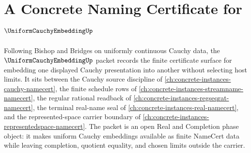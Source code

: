 \chapter{A Concrete Naming Certificate for $\UniformCauchyEmbeddingUp$}
\label{ch:concrete-instances-uniform-cauchy-embedding-namecert}

Following Bishop and Bridges on uniformly continuous Cauchy data, the $\UniformCauchyEmbeddingUp$ packet records the finite certificate surface for embedding one displayed Cauchy presentation into another without selecting host limits. It sits between the Cauchy source discipline of \autoref{ch:concrete-instances-cauchy-namecert}, the finite schedule rows of \autoref{ch:concrete-instances-streamname-namecert}, the regular rational readback of \autoref{ch:concrete-instances-regseqrat-namecert}, the terminal real-name seal of \autoref{ch:concrete-instances-real-namecert}, and the represented-space carrier boundary of \autoref{ch:concrete-instances-representedspace-namecert}. The packet is an open Real and Completion phase object: it makes uniform Cauchy embeddings available as finite NameCert data while leaving completion, quotient equality, and chosen limits outside the carrier.

